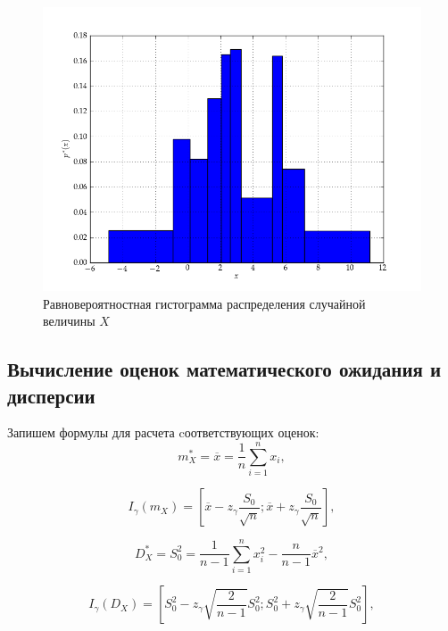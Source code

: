 \documentclass[14pt,hidelinks]{extarticle}
\begin{document}
\begin{figure}[h!]
  \centering
  \includegraphics[width=1\linewidth]{pic/stat_series_eq_probability.png}
  \caption{Равновероятностная гистограмма распределения случайной величины $ X $\label{fig:eq-prob_hist}}
\end{figure}

\subsection{Вычисление оценок математического ожидания и дисперсии}

Запишем формулы для расчета cоответствующих оценок:
\begin{equation}
  m^*_X = \overline{x} = \frac{1}{n} \sum_{i=1}^{n} x_i,
\end{equation}

\begin{equation}
  I_\gamma(m_X) = \left[ \overline{x} - z_\gamma \dfrac{S_0}{\sqrt{n}};
    \overline{x} + z_\gamma \dfrac{S_0}{\sqrt{n}} \right],
\end{equation} 

\begin{equation}
  D^*_X = S^2_0 = \frac{1}{n-1} \sum_{i=1}^{n} x^2_i - \frac{n}{n-1} \overline{x}^2,
\end{equation}

\begin{equation}
  I_\gamma(D_X) = \left[ S_0^2 - z_\gamma \sqrt{ \dfrac{2}{n-1}} S_0^2;
    S_0^2 + z_\gamma \sqrt{ \dfrac{2}{n-1}} S_0^2 \right],
\end{equation} 
\end{document}
